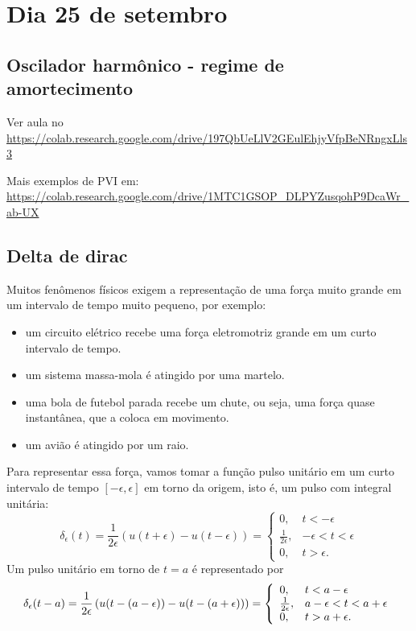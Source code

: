 \documentclass[a4paper,10pt]{book}
\begin{document}
  \chapter{Dia 25 de setembro}
  \section{Oscilador harmônico - regime de amortecimento}
  
  Ver aula no 
  \url{https://colab.research.google.com/drive/197QbUeLlV2GEulEhjyVfpBeNRngxLls3}
  
  \noindent Mais exemplos de PVI em:
  \url{https://colab.research.google.com/drive/1MTC1GSOP_DLPYZusqohP9DcaWr_ab-UX}
  
  
   \section{Delta de dirac}
   Muitos fenômenos físicos exigem a representação de uma força muito grande em um intervalo de tempo muito pequeno, por exemplo:
 \begin{itemize}
  \item um circuito elétrico recebe uma força eletromotriz grande em um curto intervalo de tempo.
  \item um sistema massa-mola é atingido por uma martelo.
  \item uma bola de futebol parada recebe um chute, ou seja, uma força quase instantânea, que a coloca em movimento.
  \item um avião é atingido por um raio.
 \end{itemize}
 Para representar essa força, vamos tomar a função pulso unitário em um curto intervalo de tempo $[-\epsilon,\epsilon]$ em torno da origem, isto é, um pulso com integral unitária:
 \begin{equation}
 \delta_\epsilon(t)=\frac{1}{2\epsilon}\left(u(t+\epsilon)-u(t-\epsilon)\right)=\left\{\begin{array}{ll}0,&t<-\epsilon\\ \frac{1}{2\epsilon},&-\epsilon<t<\epsilon\\0,&t>\epsilon.\end{array}\right.
 \end{equation}
 Um pulso unitário em torno de $t=a$ é representado por
 \begin{equation}{\label{def_delta_dirac}}
 \delta_\epsilon(t-a)=\frac{1}{2\epsilon}\left(u(t-(a-\epsilon))-u(t-(a+\epsilon))\right)=\left\{\begin{array}{ll}0,&t<a-\epsilon\\ \frac{1}{2\epsilon},&a-\epsilon<t<a+\epsilon\\0,&t>a+\epsilon.\end{array}\right.
 \end{equation}
\end{document}
